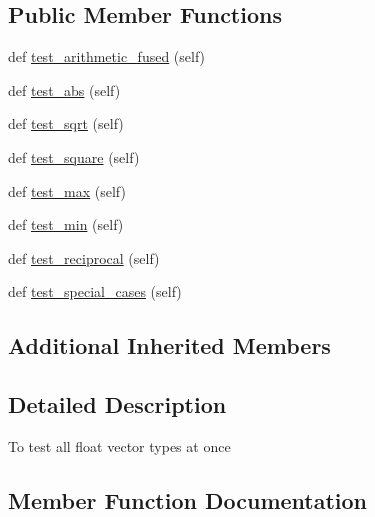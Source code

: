 \subsection*{Public Member Functions}
\begin{DoxyCompactItemize}
\item 
def \hyperlink{classnumpy_1_1core_1_1tests_1_1test__simd_1_1__SIMD__FP_aaa2fb836edcfac562acc687a64b6684a}{test\+\_\+arithmetic\+\_\+fused} (self)
\item 
def \hyperlink{classnumpy_1_1core_1_1tests_1_1test__simd_1_1__SIMD__FP_a0fdf02c7eb3127553f7062ec0fc08e98}{test\+\_\+abs} (self)
\item 
def \hyperlink{classnumpy_1_1core_1_1tests_1_1test__simd_1_1__SIMD__FP_a4d899fece545078e78e4288d4e43f8d1}{test\+\_\+sqrt} (self)
\item 
def \hyperlink{classnumpy_1_1core_1_1tests_1_1test__simd_1_1__SIMD__FP_ad2410c76e43158a6fc4a18a93c1144ba}{test\+\_\+square} (self)
\item 
def \hyperlink{classnumpy_1_1core_1_1tests_1_1test__simd_1_1__SIMD__FP_a1e14ff7f9b7d2d2794983fcaca921f6d}{test\+\_\+max} (self)
\item 
def \hyperlink{classnumpy_1_1core_1_1tests_1_1test__simd_1_1__SIMD__FP_a3e7d5bbef9538e16edfabd3a806a2765}{test\+\_\+min} (self)
\item 
def \hyperlink{classnumpy_1_1core_1_1tests_1_1test__simd_1_1__SIMD__FP_ab0084941dec70d9b94c48a983100fcc0}{test\+\_\+reciprocal} (self)
\item 
def \hyperlink{classnumpy_1_1core_1_1tests_1_1test__simd_1_1__SIMD__FP_a2a627afbbcbe7336a682a7987c3cdd98}{test\+\_\+special\+\_\+cases} (self)
\end{DoxyCompactItemize}
\subsection*{Additional Inherited Members}


\subsection{Detailed Description}
\begin{DoxyVerb}To test all float vector types at once
\end{DoxyVerb}
 

\subsection{Member Function Documentation}
\mbox{\label{classnumpy_1_1core_1_1tests_1_1test__simd_1_1__SIMD__FP_a0fdf02c7eb3127553f7062ec0fc08e98}} 
